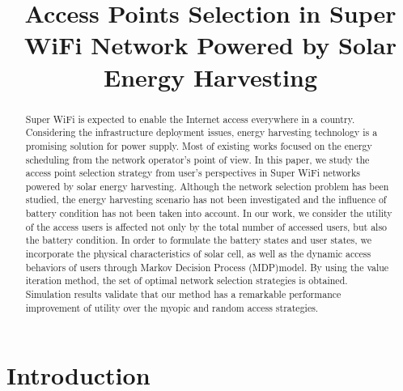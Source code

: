 \documentclass[conference]{IEEEtran}
\begin{document}
\title{Access Points Selection in Super WiFi Network Powered by Solar Energy Harvesting}

\author{
      \small{}}

\maketitle

\begin{abstract}
Super WiFi is expected to enable the Internet access everywhere in a country. Considering the infrastructure deployment issues, energy harvesting technology is a promising solution for power supply. Most of existing works focused on the energy scheduling from the network operator's point of view. In this paper, we study the access point selection strategy from user's perspectives in Super WiFi networks powered by solar energy harvesting. Although the network selection problem has been studied, the energy harvesting scenario has not been investigated and the influence of battery condition has not been taken into account. In our work, we consider the utility of the access users is affected not only by the total number of accessed users, but also the battery condition. In order to formulate the battery states and user states, we incorporate the physical characteristics of solar cell, as well as the dynamic access behaviors of users through Markov Decision Process (MDP)model. By using the value iteration method, the set of optimal network selection strategies is obtained. Simulation results validate that our method has a remarkable performance improvement of utility over the myopic and random access strategies.
\end{abstract}
\IEEEpeerreviewmaketitle

\section{Introduction}
\end{document}
